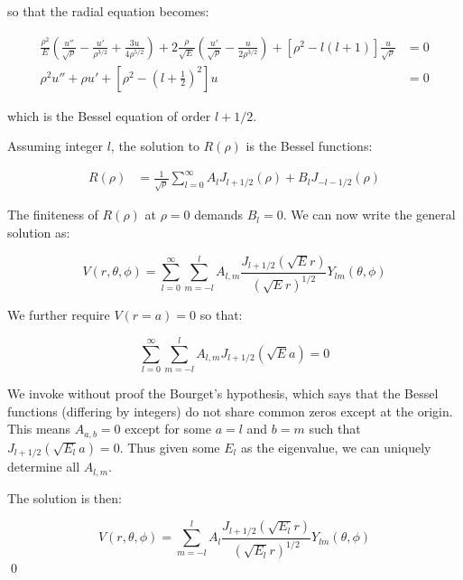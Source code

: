 \documentclass[12pt]{article}
\begin{document}
so that the radial equation becomes:

\begin{equation}
    \begin{split}
        \frac{\rho^{2}}{E} \left( \frac{u''}{\sqrt{\rho}} - \frac{u'}{\rho^{3/2}} + \frac{3u}{4\rho^{5/2}} \right) + 2 \frac{\rho}{\sqrt{E}} \left( \frac{u'}{\sqrt{\rho}} - \frac{u}{2\rho^{3/2}} \right) + \left[ \rho^{2} - l(l+1) \right] \frac{u}{\sqrt{\rho}} &= 0 \\
        \rho^{2} u'' + \rho u' + \left[ \rho^{2} - \left( l + \frac{1}{2} \right)^{2} \right] u &= 0
    \end{split}
\end{equation}

which is the Bessel equation of order $l + 1/2$.

Assuming integer $l$, the solution to $R(\rho)$ is the Bessel functions:

\begin{equation}
    \begin{split}
        R(\rho) &= \frac{1}{\sqrt{\rho}} \sum_{l = 0}^{\infty} A_{l} J_{l + 1/2}(\rho) + B_{l} J_{-l - 1/2}(\rho)
    \end{split}
\end{equation}

The finiteness of $R(\rho)$ at $\rho = 0$ demands $B_{l} = 0$. We can now write the general solution as:

\begin{equation}
    V(r, \theta, \phi) = \sum_{l = 0}^{\infty} \sum_{m = -l}^{l} A_{l, m} \frac{J_{l + 1/2}(\sqrt{E}r)}{(\sqrt{E}r)^{1/2}} Y_{lm}(\theta, \phi)
\end{equation}

We further require $V(r = a) = 0$ so that:

\begin{equation}
    \sum_{l = 0}^{\infty} \sum_{m = -l}^{l} A_{l, m} J_{l + 1/2}(\sqrt{E}a) = 0
\end{equation}

We invoke without proof the Bourget's hypothesis, which says that the Bessel functions (differing by integers) do not share common zeros except at the origin. This means $A_{a, b} = 0$ except for some $a = l$ and $b = m$ such that $J_{l + 1/2}(\sqrt{E_{l}}a) = 0$. Thus given some $E_{l}$ as the eigenvalue, we can uniquely determine all $A_{l, m}$.

The solution is then:

\begin{equation}
    V(r, \theta, \phi) = \sum_{m = -l}^{l} A_{l} \frac{J_{l + 1/2}(\sqrt{E_{l}}r)}{(\sqrt{E_{l}}r)^{1/2}} Y_{lm}(\theta, \phi)
\end{equation}
\qed
\end{document}
